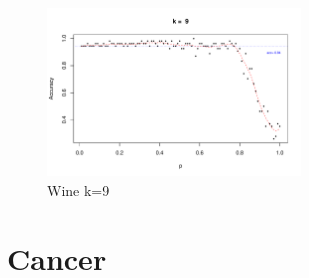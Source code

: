 \documentclass{article}
\begin{document}
\begin{figure}
 \centering
 \includegraphics[width=0.6\textwidth]{./figures/Wine_k9.pdf}
 \caption{Wine k=9}
 \label{fig:Wine9}
\end{figure}

\FloatBarrier
\section{Cancer}
\end{document}
